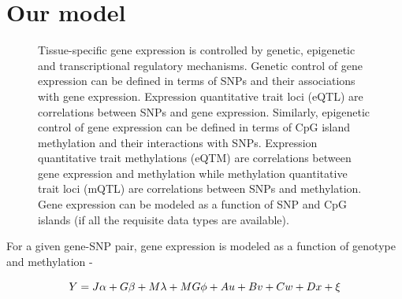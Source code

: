 \documentclass[hidelinks]{article}
\begin{document}
\section{Our model}

\begin{figure}[H]
\centering
{}
\caption[Relationships between mRNA, CpG and SNP]{Tissue-specific gene expression is controlled by genetic, epigenetic and transcriptional regulatory mechanisms. Genetic control of gene expression can be defined in terms of SNPs and their associations with gene expression. Expression quantitative trait loci (eQTL) are correlations between SNPs and gene expression.  Similarly, epigenetic control of gene expression can be defined in terms of CpG island methylation and their interactions with SNPs. Expression quantitative trait methylations (eQTM) are correlations between gene expression and methylation while methylation quantitative trait loci (mQTL) are correlations between SNPs and methylation. Gene expression can be modeled as a function of SNP and CpG islands (if all the requisite data types are available).} 
\label{fig1}
\end{figure}

For a given gene-SNP pair, gene expression is modeled as a function of genotype and methylation -

\begin{equation}
\large
Y = J\alpha + G\beta + M\lambda + MG\phi + Au + Bv + Cw + Dx + \xi
\end{equation}
\end{document}
